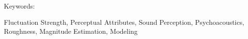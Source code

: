 \documentclass[main.tex]{subfiles}
\begin{document}
\chapter*{}

\vfill

Keywords:

Fluctuation Strength, Perceptual Attributes, Sound Perception, Psychoacoustics,
Roughness, Magnitude Estimation, Modeling
\end{document}
